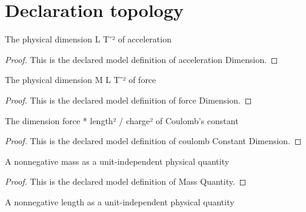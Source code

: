 \section{Declaration topology}
\begin{definition}
  \label{def:physics:phyx-mini-0901:phyxminiproblems-problemphyxmini0901-accelerationdimension}
  The physical dimension L T⁻² of acceleration
\end{definition}
\begin{proof}
  This is the declared model definition of acceleration Dimension.
\end{proof}
\begin{definition}
  \label{def:physics:phyx-mini-0901:phyxminiproblems-problemphyxmini0901-forcedimension}
  The physical dimension M L T⁻² of force
\end{definition}
\begin{proof}
  This is the declared model definition of force Dimension.
\end{proof}
\begin{definition}
  \label{def:physics:phyx-mini-0901:phyxminiproblems-problemphyxmini0901-coulombconstantdimension}
  The dimension force * length² / charge² of Coulomb's constant
\end{definition}
\begin{proof}
  This is the declared model definition of coulomb Constant Dimension.
\end{proof}
\begin{definition}
  \label{def:physics:phyx-mini-0901:phyxminiproblems-problemphyxmini0901-massquantity}
  A nonnegative mass as a unit-independent physical quantity
\end{definition}
\begin{proof}
  This is the declared model definition of Mass Quantity.
\end{proof}
\begin{definition}
  \label{def:physics:phyx-mini-0901:phyxminiproblems-problemphyxmini0901-lengthquantity}
  A nonnegative length as a unit-independent physical quantity
\end{definition}
